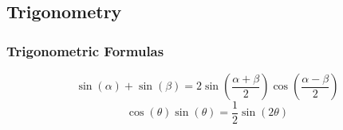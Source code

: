 \subsection{Trigonometry} \label{app:Trig}
	\subsubsection{Trigonometric Formulas} \label{subsubsec:Trig Formulas}
		\begin{equation} \label{eq:Sin plus Sin with diff Angles}
			\sin \left( \alpha \right) + \sin \left( \beta \right) = 2 \sin \left( \frac{\alpha + \beta}{2} \right) \cos\left( \frac{\alpha - \beta}{2} \right)  
		\end{equation}
		\begin{equation} \label{eq:Cosine-Sine Product}
			\cos \left( \theta \right) \sin \left( \theta \right) = \frac{1}{2} \sin \left( 2 \theta \right)
		\end{equation}